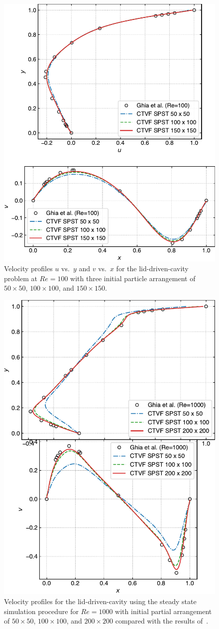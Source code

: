 \documentclass[preprint,12pt]{elsarticle}
\begin{document}
%
\begin{figure}[!htpb]
  \centering
  \includegraphics[width=0.5\linewidth]{figures/cavity/uv_re100}
  \caption{Velocity profiles $u$ vs.\ $y$ and $v$ vs.\ $x$ for the
    lid-driven-cavity problem at $Re=100$ with three initial particle
    arrangement of $50 \times 50$, $100 \times 100$, and $150 \times
    150$.}%
  \label{fig:ldc:uv_re100}
\end{figure}
%
\begin{figure}[!htpb]
  \centering
  \includegraphics[width=0.5\linewidth]{figures/cavity/uv_re1000}
  \caption{Velocity profiles for the lid-driven-cavity using the steady state
    simulation procedure for $Re = 1000$ with initial partial arrangement of
    $50 \times 50$, $100 \times 100$, and $200 \times 200$ compared with
    the results of~\cite{ldc:ghia-1982}.}%
\label{fig:ldc:uv_re1000}
\end{figure}
\end{document}
